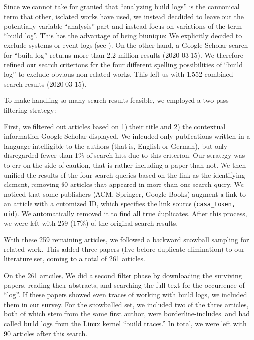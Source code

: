 Since we cannot take for granted that ``analyzing build logs'' is the
cannonical term that other, isolated works have used, we instead
decdided to leave out the potentially variable ``analysis'' part and
instead focus on variations of the term ``build log''. This has the
advantage of being biunique: We explicitly decided to exclude systems
or event logs (see ). On the other hand, a Google Scholar
search for ``build log'' returns more than 2.2 million results
(2020-03-15). We therefore refined our search criterions for the four
different spelling possibilities of ``build log'' to exclude obvious
non-related works. This left us with 1,552 combined search results
(2020-03-15).

To make handling so many search results feasible, we employed a
two-pass filtering strategy:

First, we filtered out articles based on 1) their title and 2) the
contextual information Google Scholar displayed. We inlcuded only
publications written in a language intelligible to the authors (that
is, English or German), but only disregarded fewer than 1\% of search
hits due to this criterion. Our strategy was to err on the side of
caution, that is rather including a paper than not. We then unified
the results of the four search queries based on the link as the
identifying element, removing 60 articles that appeared in more than
one search query. We noticed that some publishers (ACM, Springer,
Google Books) augment a link to an article with a cutomized ID, which
specifies the link source ({\tt casa\_token, oid}). We automatically
removed it to find all true duplicates. After this process, we were
left with 259 (17\%) of the original search results.

Wtih these 259 remaining articles, we followed a backward snowball
sampling for related work. This added three papers (five before
duplicate elimination) to our literature set, coming to a total of 261
articles. 

On the 261 artciles, We did a second filter phase by downloading the
surviving papers, reading their abstracts, and searching the full text
for the occurrence of ``log''. If these papers showed even traces of
working with build logs, we included them in our survey. For the
snowballed set, we included two of the three articles, both of which
stem from the same first author, were borderline-includes, and had
called build logs from the Linux kernel ``build traces.'' In total, we
were left with 90 articles after this search.

